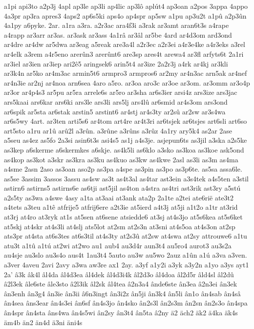 {a1pi
api3to
a2p3j
4apl
ap3le
ap3li
ap4lic
ap3lô
aplút4
ap3oan
a2pos
3appa
4appo
4a3pr
ap3ra
apres3
4aps2
ap6s5ki
aps4o
ap4spr
ap5sw
a1pu
ap3u2t
a1pû
a2p3ûn
4a1py
a6pyke.
2ar.
a1ra
a3ra.
a2r3ac
ara4f3i
a3rak
ar3amt
aran6t3s
a4rape
a4rapp
ar3arr
ar3as.
ar3ask
ar3ass
4a1râ
ar3âl
ar5be
4ard
ar4d3om
ard3ond
ar4dre
ar4dw
ar5dwa
ar3eag
a5reak
are3a4l
a2r3ec
a2r3ei
a4r3e4ke
a4r3eks
a3rel
ar4elk
a3rem
a4r5eno
arerûn3
arerûnt6
are3sp
ares4t
arewa4
ar3fl
arfyts6t
2a1ri
ar3iel
ar3ien
ar3iep
ari2ê5
aringsek6
arin5t4
ar3ize
2a2r3j
a4rk
ar4kj
ar3kli
ar3k4n
ar5ko
ar4m3ac
armin5t6
armpro3
armpros6
ar2my
ar4n3ac
arn5ak
ar4nef
ar4n3ie
ar2nj
ar4noa
arn6sea
4aro
a5ro.
ar3oa
aro3c
ar3oe
ar3om.
ar3omm
ar3o4p
ar3or
ar4p4s3
ar5pu
ar5ra
arrele6s
ar5ro
ar3sha
ar6s3ier
arsi4z
ars3ize
ars3jac
ars5kaai
ars6kar
ars6ki
ars3le
ars3li
ars5lj
ars4lû
ar6smid
ar4s3om
ars3ond
ar6spik
ar5sta
ar6stak
arstin5
arstint6
ar4stj
ar4s3ty
ar2sû
ar2sw
ar3s4wa
ar6s5wy
4art.
ar3ten
arti5s6
ar4tom
art4re
ar4t3ri
ar6tsjek
ar6tsjes
art6sli
art6so
art5sto
a1ru
ar1û
arû2l
a3rûn.
a3rûne
a3rûns
a3rûz
4a1ry
ary5k4
as2ar
2ase
a5seu
as4ez
as5fo
2a3si
asin6t3s
asi4s5
as1j
a4s3je.
asjepun6ts
as3jil
a3ska
a2s5ke
as3kep
a6skerme
a6skermkes
a6skje.
as4k5li
as6klo
a3sko
as3koa
as3koe
ask5ond
as4kop
as3kot
a3skr
as3kra
as3ku
as4kuo
as3kw
as4kwe
2asl
as3li
as3m
as4ma
a4sme
2asn
2aso
as3oan
aso2p
as3pa
a4spe
as3pin
as3po
as3p6te.
as5sa
assa6le.
as5se
3assim
3assos
3assu
as4sw
as3t
as4t3al
as4tar
ast3ein
a3s4tek
a4s5ten
a3stil
astirn6
astirns5
astirns6e
as6tji
ast5jil
as4ton
a4stra
as4tri
ast3rik
ast3ry
a5stú
a2s5ty
as3wa
a4swe
4asy
a1ta
at3aai
at3ank
ata2p
2a1te
a2tei
ate6rië
ate3t2
a4tets
a3teu
a1tê
atfrije5
atfrij6ere
a2t3ie
at5ierd
a4t3j
at5ji
a1t2o
a1tr
at3rid
at3rj
at4ro
at3ryk
at1s
at5sen
at6sene
atsiedde6
at3sj
at4s3jo
at5s6kea
at5s6ket
at5skj
at4skr
at4s3li
at4slj
ats5lot
at2sm
at2s3n
at3sni
at4s5oa
at4s3on
at2sp
ats3pr
at4sta
at6s3tes
at6s3til
at4s3ty
at2s3û
at2sw
at4swa
at2sy
attrouwe6
a1tu
atu3t
a1tû
a1tú
at2wi
at2wo
au1
aub4
au3d4r
aun3t4
au5ro4
aurot3
au3s2a
au4sje
au3slo
au3s4o
aus4t
1au3t4
5auto
au3w
au5wo
2auz
a1ûn
a1ú
a3va
a3ven.
a3ver
4aveu
2avi
2avy
a3wa
aw3re
ax1
2ay.
a3yf
a1y2i
a3yk
a3y2n
a1yo
a3ys
ayt1
2a'
â3k
âk4l
âl4da
âl4d3ea
âl4dek
âl4d3i4k
âl2d3o
âl4doa
âl2d5r
âld4sl
âl2dû
â2l3ek
âle6ste
âle3sto
â2l3ik
âl2sk
âl4tea
â2n3a4
ânde6ste
ân3ea
â2n3ei
ân3ek
ân3enh
ân3g4
ân3ie
ân3ii
â6n3ingt
ân3i2z
ân5ji
ân3k4
ân5li
ân1o
ân4sab
ân4sâ
ân4sea
âns3ear
ân4s3ei
ân6sf
ân4s3jo
ân4sko
ân2s3l
ân2s3m
ân2sn
ân2s3o
ân4spa
ân4spr
ân4sta
âns4wa
ân4s5wi
ân2sy
ân3t4
ân5ta
â2ny
ä2
äch2
äk2
ä4ka
äk4s
äm4b
än2
än4d
ä3ni
äni4s
}
